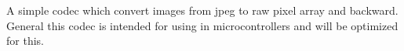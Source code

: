 A simple codec which convert images from jpeg to raw pixel array and backward. General this codec is intended for using in microcontrollers and will be optimized for this. 